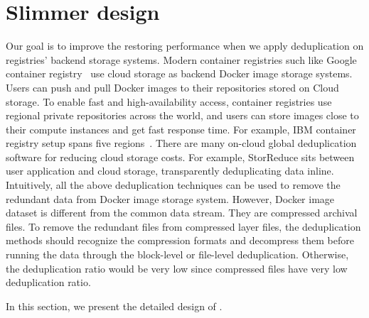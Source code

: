 \section{Slimmer design}
\label{sec:slimmer}

%



Our goal is to improve the restoring performance when we apply deduplication on registries' backend storage systems.
Modern container registries such like Google container registry~\cite{googleregistry} use cloud storage as backend Docker image storage systems. Users can push and pull Docker images to their repositories stored on Cloud storage. To enable fast and high-availability access, container registries use regional private repositories across the world, and users can store images close to their compute instances and get fast response time. For example, IBM container registry setup spans five regions~\cite{anwarfast}. 
There are many on-cloud global deduplication software for reducing cloud storage costs. For example, StorReduce sits between user application and cloud storage, transparently deduplicating data inline.
Intuitively, all the above deduplication techniques can be used to remove the redundant data from Docker image storage system.  
However, Docker image dataset is different from the common data stream. They are compressed archival files.
To remove the redundant files from compressed layer files, the deduplication methods should recognize the compression formats and decompress them before running the data through the block-level or file-level deduplication. Otherwise, the deduplication ratio would be very low since compressed files have very low deduplication ratio. 

In this section, we present the detailed design of \sysname.








